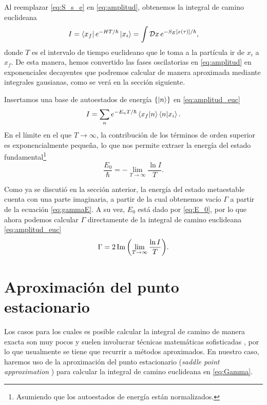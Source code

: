 Al reemplazar \eqref{eq:S_s_e} en \eqref{eq:amplitud}, obtenemos la integral de camino euclideana \cite{das2006field}
\begin{equation}\label{eq:amplitud_euc}
I = \bra{x_f}e^{-HT/\hbar}\ket{x_i} = \int \mathcal{D}x \, e^{-S_E\qty[x\qty(\tau)]/\hbar},
\end{equation}
donde $T$ es el intervalo de tiempo euclideano que le toma a la partícula ir de $x_i$ a $x_f$. De esta manera, hemos convertido las fases oscilatorias en \eqref{eq:amplitud} en exponenciales decayentes que podremos calcular de manera aproximada mediante integrales gausianas, como se verá en la sección siguiente.

Insertamos una base de autoestados de energía $\qty{\ket{n}}$ en \eqref{eq:amplitud_euc} \cite{coleman1977fate}
\begin{equation}\label{eq:Eeigen}
I = \sum_n e^{-E_n T/\hbar} \bra{x_f}\ket{n}\bra{n}\ket{x_i}.
\end{equation}
En el límite en el que $T \rightarrow \infty$, 
la contribución de los términos de orden superior es exponencialmente pequeña, lo que nos permite extraer la energía del estado fundamental\footnote{Asumiendo que los autoestados de energía están normalizados.} \cite{andreassen2017precision}
\begin{equation} \label{eq:E_0}
	\frac{E_0}{\hbar} = -\lim_{T \rightarrow \infty} \frac{ \ln I}{T}.
\end{equation}

Como ya se discutió en la sección anterior,  %
la energía del estado metaestable cuenta con una parte imaginaria, a partir de la cual obtenemos vacío $\Gamma$ a partir de la ecuación \eqref{eq:gammaE}. A su vez, $E_0$ está dado por \eqref{eq:E_0}, por lo que ahora podemos calcular $\Gamma$ directamente de la integral de camino euclideana \eqref{eq:amplitud_euc}
\begin{equation} \label{eq:Gamma}
	\Gamma = 2\Im\qty(\lim_{T \rightarrow \infty} \frac{ \ln I}{T}).
\end{equation}

\section{Aproximación del punto estacionario}

Los casos para los cuales es posible calcular la integral de camino de manera exacta son muy pocos y suelen involucrar técnicas matemáticas sofisticadas \cite{feynman2010quantum, das2006field, kleinert2009path}, por lo que usualmente se tiene que recurrir a métodos aproximados. En nuestro caso, haremos uso de la aproximación del punto estacionario (\emph{saddle point approximation} 
) para calcular la integral de camino euclideana en \eqref{eq:Gamma}. 

